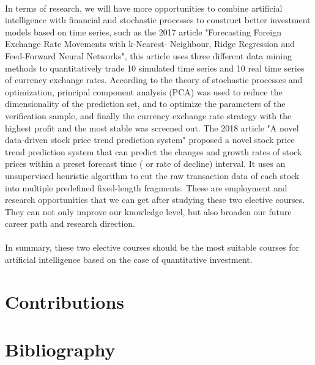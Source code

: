 \documentclass{article}
\begin{document}
    \\
    In terms of research, we will have more opportunities to combine artificial intelligence with financial and stochastic processes to construct better investment models based on time series, such as the 2017 article "Forecasting Foreign Exchange Rate Movements with k-Nearest- Neighbour, Ridge Regression and Feed-Forward Neural Networks", this article uses three different data mining methods to quantitatively trade 10 simulated time series and 10 real time series of currency exchange rates. According to the theory of stochastic processes and optimization, principal component analysis (PCA) was used to reduce the dimensionality of the prediction set, and to optimize the parameters of the verification sample, and finally the currency exchange rate strategy with the highest profit and the most stable was screened out. The 2018 article "A novel data-driven stock price trend prediction system" proposed a novel stock price trend prediction system that can predict the changes and growth rates of stock prices within a preset forecast time ( or rate of decline) interval. It uses an unsupervised heuristic algorithm to cut the raw transaction data of each stock into multiple predefined fixed-length fragments. These are employment and research opportunities that we can get after studying these two elective courses. They can not only improve our knowledge level, but also broaden our future career path and research direction.\\
    \\
    In summary, these two elective courses should be the most suitable courses for artificial intelligence based on the case of quantitative investment.



	
	
	\section{Contributions}
	
	\section{Bibliography}
	
\end{document}
